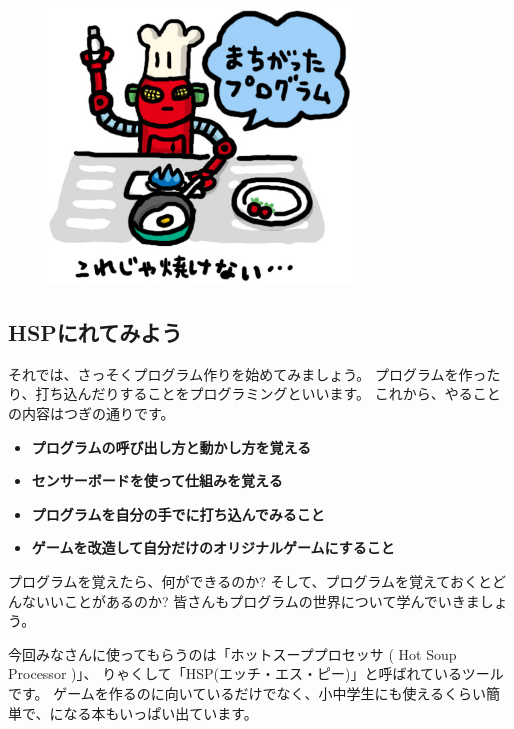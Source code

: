 \begin{figure}[H]
  \begin{center}
    \includegraphics[width=8.031cm,height=7.304cm]{images/chap02/text02-img006.jpg}
  \end{center}
  \label{fig:robot}
\end{figure}
\clearpage

% 
% 
% 
\subsection{HSPにれてみよう}

それでは、さっそくプログラム作りを始めてみましょう。
プログラムを作ったり、打ち込んだりすることをプログラミングといいます。
これから、やることの内容はつぎの通りです。

\begin{itemize}
  \item \textbf{プログラムの呼び出し方と動かし方を覚える}
  \item \textbf{センサーボードを使って仕組みを覚える}
  \item \textbf{プログラムを自分の手でに打ち込んでみること}
  \item \textbf{ゲームを改造して自分だけのオリジナルゲームにすること}
\end{itemize}

プログラムを覚えたら、何ができるのか?
そして、プログラムを覚えておくとどんないいことがあるのか?
皆さんもプログラムの世界について学んでいきましょう。

今回みなさんに使ってもらうのは「ホットスーププロセッサ ( Hot Soup Processor )」、
りゃくして「HSP(エッチ・エス・ピー)」と呼ばれているツールです。
ゲームを作るのに向いているだけでなく、小中学生にも使えるくらい簡単で、になる本もいっぱい出ています。

